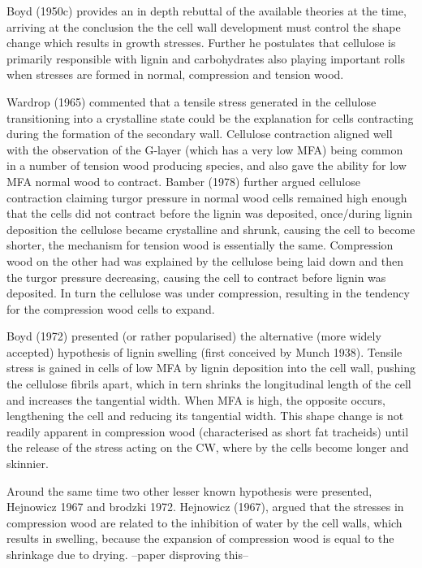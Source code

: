 \documentclass{article}
\begin{document}
Boyd (1950c) provides an in depth rebuttal of the available theories at the
time, arriving at the conclusion the the cell wall development must control the shape
change which results in growth stresses. Further he postulates that cellulose
is primarily responsible with lignin and carbohydrates also playing important
rolls when stresses are formed in normal, compression and tension wood.

Wardrop (1965) commented that a tensile stress generated in the cellulose
transitioning into a crystalline state could be the explanation for cells
contracting during the formation of the secondary wall. Cellulose contraction
aligned well with the observation of the G-layer (which has  a very low
MFA) being common in a number of tension wood producing species, and also gave
the ability for low MFA normal wood to contract. Bamber (1978) further argued
cellulose contraction claiming turgor pressure in normal wood cells remained
high enough that the cells did not contract before the lignin was deposited,
once/during lignin deposition the cellulose became crystalline and shrunk,
causing the cell to become shorter, the mechanism for tension wood is
essentially the same. Compression wood on the other had was explained by the
cellulose being laid down and then the turgor pressure decreasing, causing the
cell to contract before lignin was deposited. In turn the cellulose was under
compression, resulting in the tendency for the compression wood cells to
expand.

Boyd (1972) presented (or rather popularised) the alternative (more widely
accepted) hypothesis of lignin swelling (first conceived by Munch 1938). Tensile
stress is gained in cells of low MFA by lignin deposition into the cell wall,
pushing the cellulose fibrils apart, which in tern shrinks the longitudinal
length of the cell and increases the tangential width. When MFA is high, the
opposite occurs, lengthening the cell and reducing its tangential width. This
shape change is not readily apparent in compression wood (characterised as short fat
tracheids) until the release of the stress acting on the CW, where by the cells
become longer and skinnier.

Around the same time two other lesser known hypothesis were presented, Hejnowicz
1967 and brodzki 1972. Hejnowicz (1967), argued that the stresses in compression
wood are related to the inhibition of water by the cell walls, which results in
swelling, because the expansion of compression wood is equal to the shrinkage
due to drying. --paper disproving this--
\end{document}
